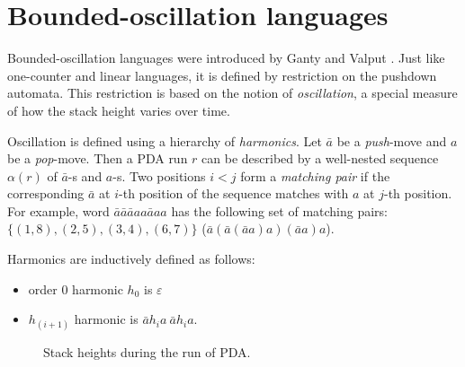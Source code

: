 \section{Bounded-oscillation languages}
\label{sec:osc}
Bounded-oscillation languages were introduced by Ganty and Valput \cite{BoundOsc}. Just like one-counter and linear languages, it is defined by restriction on the pushdown automata. This restriction is based on the notion of \textit{oscillation}, a special measure of how the stack height varies over time. 


Oscillation is defined using a hierarchy of \textit{harmonics}. Let $\bar{a}$ be a \textit{push}-move and $a$ be a \textit{pop}-move. Then a PDA run $r$ can be described by a well-nested sequence $\alpha(r)$ of $\bar{a}$-s and $a$-s. Two positions $i<j$ form a \textit{matching pair} if the corresponding $\bar{a}$ at $i$-th position of the sequence matches with $a$ at $j$-th position. For example, word $\bar{a}\bar{a}\bar{a}aa\bar{a}aa$ has the following set of matching pairs: $\{(1, 8), (2, 5), (3, 4), (6, 7)\}$ ($\bar{a}(\bar{a}(\bar{a}a)a)(\bar{a}a)a$).


Harmonics are inductively defined as follows:
\begin{itemize}
\item  order 0 harmonic $h_0$ is $\varepsilon$
\item  $h_{(i+1)}$ harmonic is $\bar{a}h_ia\ \bar{a}h_ia$.
\end{itemize}
\begin{figure}
\centering
{}
\caption{Stack heights during the run of PDA.}
\label{oscb}
\end{figure}



